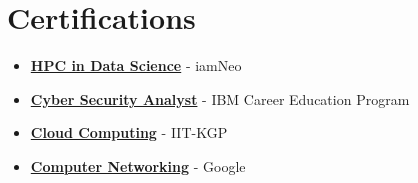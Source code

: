 \documentclass[a4paper,10pt]{article}
\begin{document}
    \section{Certifications}
  \begin{itemize}
    \item \href{https://vit162.examly.io/certificate/U2FsdGVkX1%2FGbYKjS9DZ8Xo8HPc6ePhKpo1V9zRP3RI%3D}{\textbf{HPC in Data Science}} - iamNeo 
    \item \href{https://courses.ibmcep.cognitiveclass.ai/certificates/c193fe199bc94fb79aa6c794c9fa4cbe}{\textbf{Cyber Security Analyst}} - IBM Career Education Program 
    \item \href{https://archive.nptel.ac.in/content/noc/NOC24/SEM1/Ecertificates/106/noc24-cs17/Course/NPTEL24CS17S35290010730645933.pdf}{\textbf{Cloud Computing}} - IIT-KGP 
    \item \href{https://www.coursera.org/account/accomplishments/verify/S5WH7S2FUYZJ?utm_source=link&utm_medium=certificate&utm_content=cert_image&utm_campaign=sharing_cta&utm_product=course}{\textbf{Computer Networking}} - Google
    
\end{itemize}
\end{document}
